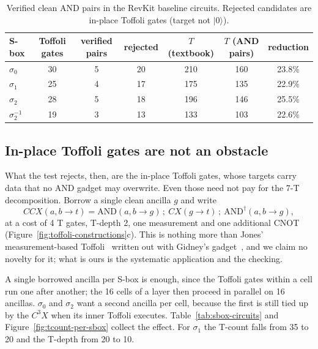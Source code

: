 \documentclass[runningheads,10pt]{llncs}
\begin{document}
\begin{table}[htbp]
\centering
\caption{Verified clean AND pairs in the RevKit baseline circuits. Rejected candidates are in-place Toffoli gates (target not $|0\rangle$).}
\label{tab:clean-and-pairs}
\small
\begin{tabular}{lcccccc}
\toprule
S-box & Toffoli gates & verified pairs & rejected & $T$ (textbook) & $T$ (AND pairs) & reduction \\
\midrule
$\sigma_0$ & 30 & 5 & 20 & 210 & 160 & 23.8\% \\
$\sigma_1$ & 25 & 4 & 17 & 175 & 135 & 22.9\% \\
$\sigma_2$ & 28 & 5 & 18 & 196 & 146 & 25.5\% \\
$\sigma_2^{-1}$ & 19 & 3 & 13 & 133 & 103 & 22.6\% \\
\bottomrule
\end{tabular}
\end{table}

\subsection{In-place Toffoli gates are not an obstacle}
\label{sec:in-place-toffoli}

What the test rejects, then, are the in-place Toffoli gates, whose targets carry data that no AND gadget may overwrite. Even those need not pay for the 7-T decomposition. Borrow a single clean ancilla $g$ and write
\begin{equation}
CCX(a,b \to t) = \mathrm{AND}(a,b \to g)\,;\ CX(g\to t)\,;\ \mathrm{AND}^\dagger(a,b\to g),
\label{eq:borrowed-toffoli}
\end{equation}
at a cost of 4 T gates, T-depth 2, one measurement and one additional CNOT (Figure~\ref{fig:toffoli-constructions}c). This is nothing more than Jones' measurement-based Toffoli~\cite{jones2013lowoverhead} written out with Gidney's gadget~\cite{gidney2018halving}, and we claim no novelty for it; what is ours is the systematic application and the checking. 

A single borrowed ancilla per S-box is enough, since the Toffoli gates within a cell run one after another; the 16 cells of a layer then proceed in parallel on 16 ancillas. $\sigma_0$ and $\sigma_2$ want a second ancilla per cell, because the first is still tied up by the $C^3X$ when its inner Toffoli executes. Table~\ref{tab:sbox-circuits} and Figure~\ref{fig:tcount-per-sbox} collect the effect. For $\sigma_1$ the T-count falls from 35 to 20 and the T-depth from 20 to 10.
\end{document}
